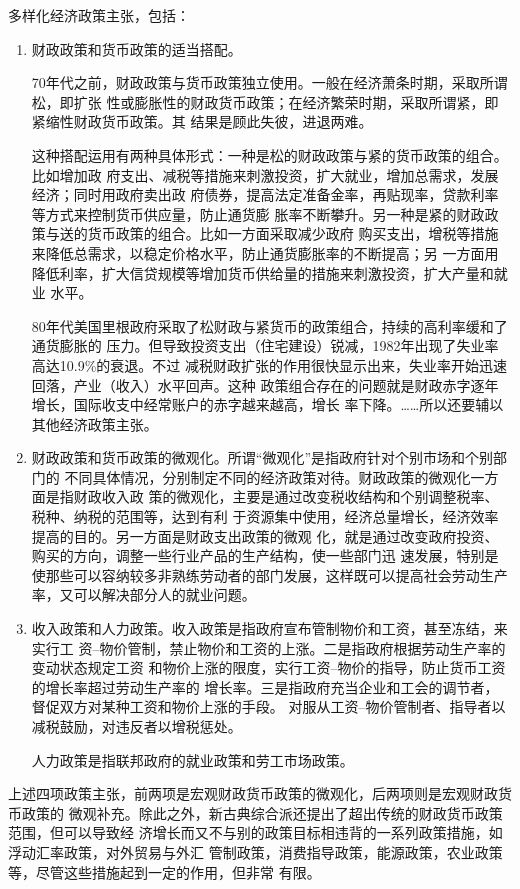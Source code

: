 多样化经济政策主张，包括：
\begin{enumerate}
\item 财政政策和货币政策的适当搭配。

  70年代之前，财政政策与货币政策独立使用。一般在经济萧条时期，采取所谓松，即扩张
  性或膨胀性的财政货币政策；在经济繁荣时期，采取所谓紧，即紧缩性财政货币政策。其
  结果是顾此失彼，进退两难。

  这种搭配运用有两种具体形式：一种是松的财政政策与紧的货币政策的组合。比如增加政
  府支出、减税等措施来刺激投资，扩大就业，增加总需求，发展经济；同时用政府卖出政
  府债券，提高法定准备金率，再贴现率，贷款利率等方式来控制货币供应量，防止通货膨
  胀率不断攀升。另一种是紧的财政政策与送的货币政策的组合。比如一方面采取减少政府
  购买支出，增税等措施来降低总需求，以稳定价格水平，防止通货膨胀率的不断提高；另
  一方面用降低利率，扩大信贷规模等增加货币供给量的措施来刺激投资，扩大产量和就业
  水平。

  80年代美国里根政府采取了松财政与紧货币的政策组合，持续的高利率缓和了通货膨胀的
  压力。但导致投资支出（住宅建设）锐减，1982年出现了失业率高达10.9\%的衰退。不过
  减税财政扩张的作用很快显示出来，失业率开始迅速回落，产业（收入）水平回声。这种
  政策组合存在的问题就是财政赤字逐年增长，国际收支中经常账户的赤字越来越高，增长
  率下降。……所以还要辅以其他经济政策主张。


\item 财政政策和货币政策的微观化。所谓“微观化”是指政府针对个别市场和个别部门的
  不同具体情况，分别制定不同的经济政策对待。财政政策的微观化一方面是指财政收入政
  策的微观化，主要是通过改变税收结构和个别调整税率、税种、纳税的范围等，达到有利
  于资源集中使用，经济总量增长，经济效率提高的目的。另一方面是财政支出政策的微观
  化，就是通过改变政府投资、购买的方向，调整一些行业产品的生产结构，使一些部门迅
  速发展，特别是使那些可以容纳较多非熟练劳动者的部门发展，这样既可以提高社会劳动生产
  率，又可以解决部分人的就业问题。


\item 收入政策和人力政策。收入政策是指政府宣布管制物价和工资，甚至冻结，来实行工
  资--物价管制，禁止物价和工资的上涨。二是指政府根据劳动生产率的变动状态规定工资
  和物价上涨的限度，实行工资--物价的指导，防止货币工资的增长率超过劳动生产率的
  增长率。三是指政府充当企业和工会的调节者，督促双方对某种工资和物价上涨的手段。
  对服从工资--物价管制者、指导者以减税鼓励，对违反者以增税惩处。

  人力政策是指联邦政府的就业政策和劳工市场政策。
\end{enumerate}

上述四项政策主张，前两项是宏观财政货币政策的微观化，后两项则是宏观财政货币政策的
微观补充。除此之外，新古典综合派还提出了超出传统的财政货币政策范围，但可以导致经
济增长而又不与别的政策目标相违背的一系列政策措施，如浮动汇率政策，对外贸易与外汇
管制政策，消费指导政策，能源政策，农业政策等，尽管这些措施起到一定的作用，但非常
有限。

